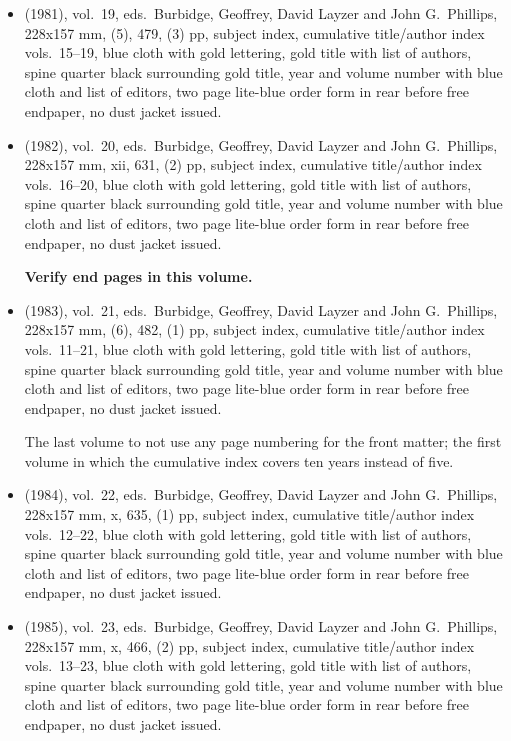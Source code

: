 \begin{itemize}
	\item (1981), vol.\ 19, eds.\ Burbidge, Geoffrey, David Layzer and John G.\ Phillips, 228x157 mm,
	(5), 479, (3) pp, subject index, cumulative title/author index vols.\ 15--19,
	blue cloth with gold lettering, gold title with list of authors,
  spine quarter black surrounding gold title, year and volume number with blue cloth and list of
  editors, two page lite-blue order form in rear before free endpaper, no dust jacket issued.
  
	\item (1982), vol.\ 20, eds.\ Burbidge, Geoffrey, David Layzer and John G.\ Phillips, 228x157 mm,
	xii, 631, (2) pp, subject index, cumulative title/author index vols.\ 16--20,
	blue cloth with gold lettering, gold title with list of authors,
  spine quarter black surrounding gold title, year and volume number with blue cloth and list of
  editors, two page lite-blue order form in rear before free endpaper, no dust jacket issued.
  
  \textbf{Verify end pages in this volume.}
  
	\item (1983), vol.\ 21, eds.\ Burbidge, Geoffrey, David Layzer and John G.\ Phillips, 228x157 mm,
	(6), 482, (1) pp, subject index, cumulative title/author index vols.\ 11--21,
	blue cloth with gold lettering, gold title with list of authors,
  spine quarter black surrounding gold title, year and volume number with blue cloth and list of
  editors, two page lite-blue order form in rear before free endpaper, no dust jacket issued.
  
  The last volume to not use any page numbering for the front matter; the first volume in which
  the cumulative index covers ten years instead of five.
  
	\item (1984), vol.\ 22, eds.\ Burbidge, Geoffrey, David Layzer and John G.\ Phillips, 228x157 mm,
	x, 635, (1) pp, subject index, cumulative title/author index vols.\ 12--22,
	blue cloth with gold lettering, gold title with list of authors,
  spine quarter black surrounding gold title, year and volume number with blue cloth and list of
  editors, two page lite-blue order form in rear before free endpaper, no dust jacket issued.
  
	\item (1985), vol.\ 23, eds.\ Burbidge, Geoffrey, David Layzer and John G.\ Phillips, 228x157 mm,
	x, 466, (2) pp, subject index, cumulative title/author index vols.\ 13--23,
	blue cloth with gold lettering, gold title with list of authors,
  spine quarter black surrounding gold title, year and volume number with blue cloth and list of
  editors, two page lite-blue order form in rear before free endpaper, no dust jacket issued.


\end{itemize}
